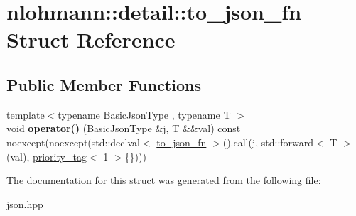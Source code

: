 \hypertarget{structnlohmann_1_1detail_1_1to__json__fn}{}\section{nlohmann\+:\+:detail\+:\+:to\+\_\+json\+\_\+fn Struct Reference}
\label{structnlohmann_1_1detail_1_1to__json__fn}
\subsection*{Public Member Functions}
\begin{DoxyCompactItemize}
\item 
{\footnotesize template$<$typename Basic\+Json\+Type , typename T $>$ }\\void {\bfseries operator()} (Basic\+Json\+Type \&j, T \&\&val) const noexcept(noexcept(std\+::declval$<$ \hyperlink{structnlohmann_1_1detail_1_1to__json__fn}{to\+\_\+json\+\_\+fn} $>$().call(j, std\+::forward$<$ T $>$(val), \hyperlink{structnlohmann_1_1detail_1_1priority__tag}{priority\+\_\+tag}$<$ 1 $>$\{\})))\hypertarget{structnlohmann_1_1detail_1_1to__json__fn_a29dfa4bfda3ac49ea22a76aaf2af6e0c}{}\label{structnlohmann_1_1detail_1_1to__json__fn_a29dfa4bfda3ac49ea22a76aaf2af6e0c}

\end{DoxyCompactItemize}


The documentation for this struct was generated from the following file\+:\begin{DoxyCompactItemize}
\item 
json.\+hpp\end{DoxyCompactItemize}
